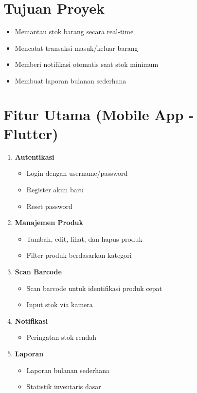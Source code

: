 \documentclass[a4paper,12pt]{article}
\begin{document}
\section{Tujuan Proyek}
\begin{itemize}[leftmargin=1.5cm]
    \item Memantau stok barang secara real-time
    \item Mencatat transaksi masuk/keluar barang
    \item Memberi notifikasi otomatis saat stok minimum
    \item Membuat laporan bulanan sederhana
\end{itemize}

\section{Fitur Utama (Mobile App - Flutter)}
\begin{enumerate}[leftmargin=1.5cm]
    \item \textbf{Autentikasi}
    \begin{itemize}
        \item Login dengan username/password
        \item Register akun baru
        \item Reset password
    \end{itemize}
    \item \textbf{Manajemen Produk}
    \begin{itemize}
        \item Tambah, edit, lihat, dan hapus produk
        \item Filter produk berdasarkan kategori
    \end{itemize}
    \item \textbf{Scan Barcode}
    \begin{itemize}
        \item Scan barcode untuk identifikasi produk cepat
        \item Input stok via kamera
    \end{itemize}
    \item \textbf{Notifikasi}
    \begin{itemize}
        \item Peringatan stok rendah
    \end{itemize}
    \item \textbf{Laporan}
    \begin{itemize}
        \item Laporan bulanan sederhana
        \item Statistik inventaris dasar
    \end{itemize}
\end{enumerate}
\end{document}
